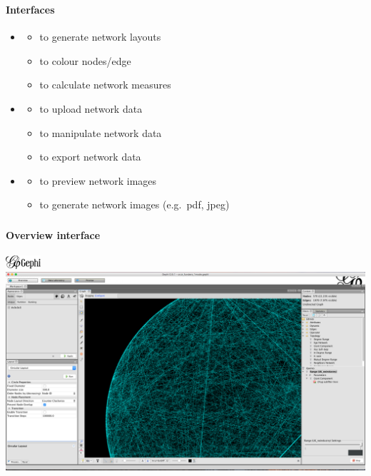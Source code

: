 \documentclass[8pt]{beamer}
\begin{document}
\begin{frame}
\frametitle{\insertsection}
\framesubtitle{Interfaces}

\begin{itemize}
\item {\color{blue}{Overview}} 
    \begin{itemize}
    \item to generate network layouts
    \item to colour nodes/edge
    \item to calculate network measures
    \end{itemize}


\item {\color{blue}{Data laboratory}}
    \begin{itemize}
    \item to upload network data
    \item to manipulate network data
    \item to export network data
    \end{itemize}
    
    
\item {\color{blue}{Preview}}
    \begin{itemize}
    \item to preview network images
    \item to generate network images (e.g.\ pdf, jpeg)
    \end{itemize}

\end{itemize}

\end{frame}


\begin{frame}
\frametitle{\insertsection}
\framesubtitle{Overview interface}

\includegraphics[height=0.5cm]{gephi_logo}\\
\includegraphics[width=\linewidth, frame]{gephi_interface1}

\end{frame}
\end{document}
